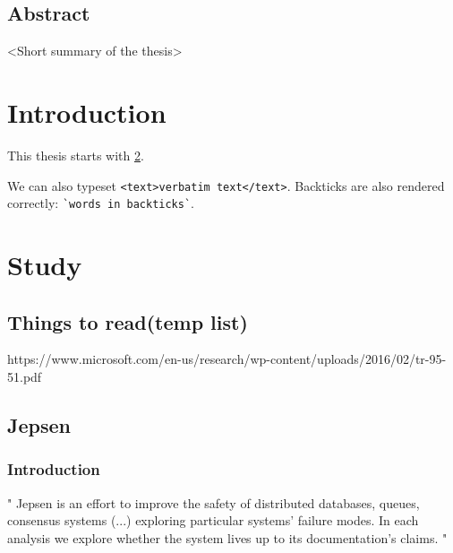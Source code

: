 \documentclass[
  a4paper,  %
  twoside,  %
  bibliography=totoc,
  headsepline,
  cleardoublepage=empty,
  parskip=half,
  draft=false
]{scrbook}
\begin{document}
\renewcommand*{\chapterpagestyle}{preamble}


  \section*{Abstract}


<Short summary of the thesis>




\renewcommand*{\chapterpagestyle}{scrplain}
\pagestyle{scrheadings}
\pagestyle{scrheadings}
\ihead[]{}
\chead[]{}
\ohead[]{\headmark}
\cfoot[]{}
\ifoot[]{}






%
%


\chapter{Introduction}

This thesis starts with \cref{chap:k2}.

We can also typeset \verb|<text>verbatim text</text>|.
Backticks are also rendered correctly: \verb|`words in backticks`|.

\chapter{Study}
\label{chap:k2}

\section{Things to read(temp list)}

https://www.microsoft.com/en-us/research/wp-content/uploads/2016/02/tr-95-51.pdf


\section{Jepsen}
\subsection{Introduction}
"
Jepsen is an effort to improve the safety of distributed databases, queues, consensus systems  (...) exploring particular systems’ failure modes. In each analysis we explore whether the system lives up to its documentation’s claims.
"\cite{jepsonio}
\\
\end{document}
